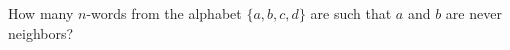How many $n$-words from the alphabet $\{a, b, c, d\}$ are such that $a$ and $b$ are never neighbors?
